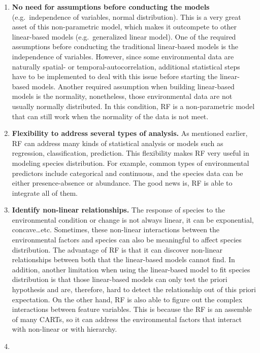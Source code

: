 \documentclass[
]{article}
\begin{document}
\begin{enumerate}
\def\labelenumi{\arabic{enumi}.}
\item
  \textbf{No need for assumptions before conducting the models}
  (e.g.~independence of variables, normal distribution). This is a very
  great asset of this non-parametric model, which makes it outcompete to
  other linear-based models (e.g.~generalized linear model). One of the
  required assumptions before conducting the traditional linear-based
  models is the independence of variables. However, since some
  environmental data are naturally spatial- or temporal-autocorrelation,
  additional statistical steps have to be implemented to deal with this
  issue before starting the linear-based models. Another required
  assumption when building linear-based models is the normality,
  nonetheless, those environmental data are not usually normally
  distributed. In this condition, RF is a non-parametric model that can
  still work when the normality of the data is not meet.
\item
  \textbf{Flexibility to address several types of analysis.} As
  mentioned earlier, RF can address many kinds of statistical analysis
  or models such as regression, classification, prediction. This
  flexibility makes RF very useful in modeling species distribution. For
  example, common types of environmental predictors include categorical
  and continuous, and the species data can be either presence-absence or
  abundance. The good news is, RF is able to integrate all of them.
\item
  \textbf{Identify non-linear relationships.} The response of species to
  the environmental condition or change is not always linear, it can be
  exponential, concave\ldots{}etc. Sometimes, these non-linear
  interactions between the environmental factors and species can also be
  meaningful to affect species distribution. The advantage of RF is that
  it can discover non-linear relationships between both that the
  linear-based models cannot find. In addition, another limitation when
  using the linear-based model to fit species distribution is that those
  linear-based models can only test the priori hypothesis and are,
  therefore, hard to detect the relationship out of this priori
  expectation. On the other hand, RF is also able to figure out the
  complex interactions between feature variables. This is because the RF
  is an assemble of many CARTs, so it can address the environmental
  factors that interact with non-linear or with hierarchy.
\item

\end{enumerate}
\end{document}
